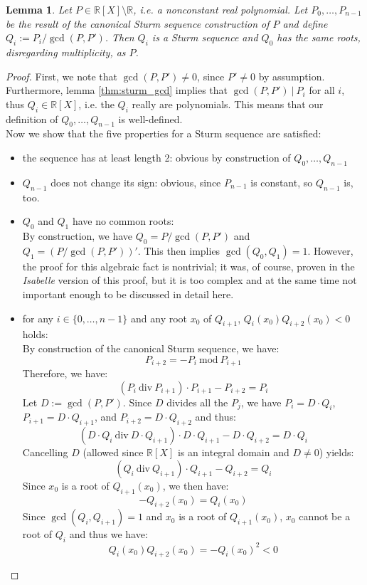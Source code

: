 \documentclass[11pt,a4paper,oneside]{article}
\newtheorem{lemma}[definition]{Lemma}
\newcommand{\RR}{\mathbb{R}}
\begin{document}
\begin{lemma}\label{thm:sturm_multiple_aux}
Let $P\in\RR[X]\setminus\RR$, i.e. a nonconstant real polynomial. Let $P_0,\ldots,P_{n-1}$ be the result of the canonical Sturm sequence construction of $P$ and define $Q_i := P_i / \gcd(P,P')$. Then $Q_i$ is a Sturm sequence and $Q_0$ has the same roots, disregarding multiplicity, as $P$.
\end{lemma}
\begin{proof}
First, we note that $\gcd(P,P')\neq 0$, since $P'\neq 0$ by assumption. Furthermore, lemma \ref{thm:sturm_gcd} implies that $\gcd(P,P')\ |\ P_i$ for all $i$, thus $Q_i\in\RR[X]$, i.e. the $Q_i$ really are polynomials. This means that our definition of $Q_0,\ldots,Q_{n-1}$ is well-defined.\\
Now we show that the five properties for a Sturm sequence are satisfied:
\begin{itemize}
\item the sequence has at least length 2: obvious by construction of $Q_0, \ldots, Q_{n-1}$
\item $Q_{n-1}$ does not change its sign: obvious, since $P_{n-1}$ is constant, so $Q_{n-1}$ is, too.
\item $Q_0$ and $Q_1$ have no common roots:\\
By construction, we have $Q_0 = P / \gcd(P,P')$ and $Q_1 = (P / \gcd(P, P'))'$. This then implies $\gcd(Q_0, Q_1) = 1$. However, the proof for this algebraic fact is nontrivial; it was, of course, proven in the \emph{Isabelle} version of this proof, but it is too complex and at the same time not important enough to be discussed in detail here.
\item for any $i\in\{0,\ldots,n-1\}$ and any root $x_0$ of $Q_{i+1}$, $Q_{i}(x_0)Q_{i+2}(x_0) < 0$ holds:\\
By construction of the canonical Sturm sequence, we have:
$$P_{i+2} = -P_{i}\ \mathrm{mod}\ P_{i+1}$$
Therefore, we have:
$$(P_{i}\ \mathrm{div}\ P_{i+1}) \cdot P_{i+1} - P_{i+2} = P_{i}$$
Let $D:=\gcd(P,P')$. Since $D$ divides all the $P_j$, we have $P_{i}=D\cdot Q_{i}$, $P_{i+1}=D\cdot Q_{i+1}$, and $P_{i+2}=D\cdot Q_{i+2}$ and thus:
$$(D\cdot Q_{i}\ \mathrm{div}\ D\cdot Q_{i+1}) \cdot D\cdot Q_{i+1} - D\cdot Q_{i+2} = D\cdot Q_{i}$$
Cancelling $D$ (allowed since $\RR[X]$ is an integral domain and $D\neq 0$) yields:
$$(Q_{i}\ \mathrm{div}\ Q_{i+1}) \cdot Q_{i+1} - Q_{i+2} = Q_{i}$$
Since $x_0$ is a root of $Q_{i+1}(x_0)$, we then have:
$$-Q_{i+2}(x_0) = Q_{i}(x_0)$$
Since $\gcd(Q_{i}, Q_{i+1}) = 1$ and $x_0$ is a root of $Q_{i+1}(x_0)$, $x_0$ cannot be a root of $Q_{i}$ and thus we have:
$$Q_{i}(x_0)Q_{i+2}(x_0) = -Q_{i}(x_0)^2 < 0$$


\end{itemize}
\end{proof}
\end{document}
